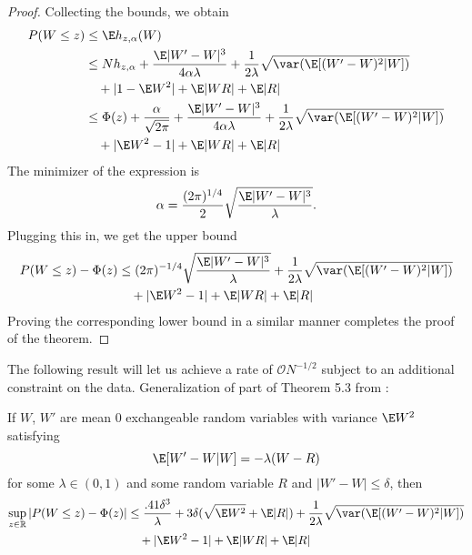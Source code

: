 \begin{proof}
  Collecting the bounds, we obtain
  \begin{equation}
    \begin{split}
      P(W \leq z) &\leq \E h_{z,\alpha}(W) \\
      &\leq Nh_{z,\alpha} + \frac{\E |W'-W|^3}{4 \alpha \lambda}
      + \frac{1}{2\lambda} \sqrt{\var (\E [(W'-W)^2|W])} \\
      &\quad + |1 - \E W^2| + \E |WR| + \E |R| \\
      &\leq \Phi (z) + \frac{\alpha}{\sqrt{2\pi}} + \frac{\E |W'-W|^3}{4 \alpha \lambda}
      + \frac{1}{2\lambda} \sqrt{\var (\E [(W'-W)^2|W])} \\
      &\quad + |\E W^2 - 1| + \E |WR| + \E |R|
    \end{split}
  \end{equation}
  The minimizer of the expression is
  \begin{equation}
    \alpha = \frac{(2\pi)^{1/4}}{2}\sqrt{\frac{\E |W'-W|^3}{\lambda}}.
  \end{equation}
  Plugging this in, we get the upper bound
  \begin{equation}
    \begin{split}
      P(W \leq z) - \Phi(z) &\leq (2\pi)^{-1/4} \sqrt{\frac{\E |W'-W|^3}{\lambda}}
      + \frac{1}{2\lambda} \sqrt{\var (\E [(W'-W)^2|W])} \\
      &\quad + |\E W^2 - 1| + \E |WR| + \E |R|
    \end{split}
  \end{equation}
  Proving the corresponding lower bound in a similar manner completes the proof of the theorem.
\end{proof}

The following result will let us achieve a rate of $\mathcal{O}N^{-1/2}$ subject to an
additional constraint on the data.
Generalization of part of Theorem 5.3 from \cite{chen2010normal}:
\begin{theorem}
  \label{T:better-rate}
  If $W$, $W'$ are mean 0 exchangeable random variables with variance
  $\E W^2$
  satisfying
  \begin{equation*}
    \E[W'-W|W] = -\lambda(W-R)
  \end{equation*}
  for some $\lambda \in (0,1)$ and some random variable $R$ and $|W'-W| \leq \delta$, then
  \begin{equation*}
    \begin{split}
      \sup_{z \in \mathbb{R}} |P(W \leq z) - \Phi(z)|
      &\leq \frac{.41 \delta^3}{\lambda} + 3 \delta (\sqrt{\E W^2} + \E |R|)
      + \frac{1}{2\lambda} \sqrt{\var (\E [(W'-W)^2|W])} \\
      &\quad + |\E W^2 - 1| + \E |WR| + \E |R|
    \end{split}
  \end{equation*}
\end{theorem}

